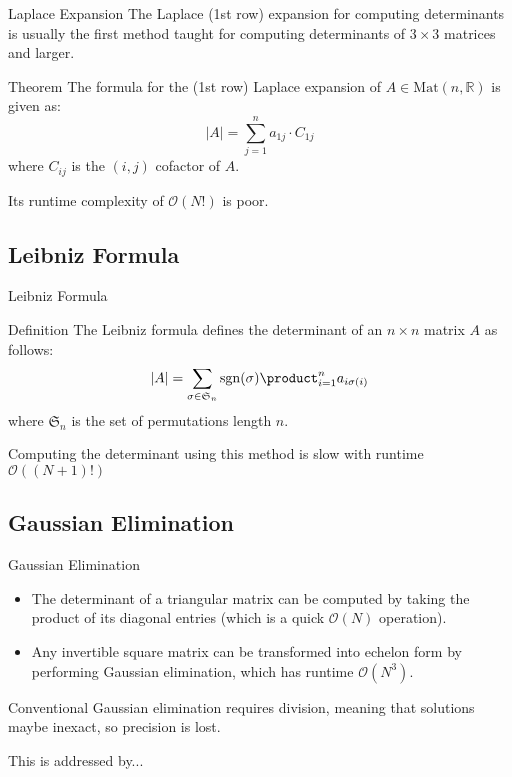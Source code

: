 \documentclass{beamer}
\begin{document}
\begin{frame}{Laplace Expansion}
    The Laplace (1st row) expansion for computing determinants is usually the first method taught for
    computing determinants of $3 \times 3$ matrices and larger.

    \begin{block}{Theorem}
        The formula for the (1st row) Laplace expansion of $A \in \mathrm{Mat}(n, \mathbb{R})$ is given as:
        \[
            |A| = \sum_{j=1}^n a_{1j}\cdot C_{1j}
        \]
        where $C_{ij}$ is the $(i, j)$ cofactor of $A$.
    \end{block}

    Its runtime complexity of $\mathcal{O}(N!)$ is poor.

\end{frame}

\subsection{Leibniz Formula}

\begin{frame}{Leibniz Formula}
    \begin{block}{Definition}
        The Leibniz formula defines the determinant of an $n \times n$ matrix $A$ as follows:
        \[
            |A| = \sum_{\sigma \in \mathfrak{S}_n} \mathrm{sgn}(\sigma) \product_{i=1}^n a_{i \sigma(i)}
        \]
        where $\mathfrak{S}_n$ is the set of permutations length $n$.
    \end{block}

    Computing the determinant using this method is slow with runtime $\mathcal{O}((N+1)!)$
\end{frame}

\subsection{Gaussian Elimination}

\begin{frame}{Gaussian Elimination}

    \begin{itemize}

        \item The determinant of a triangular matrix can be computed by taking the product of its
            diagonal entries (which is a quick $\mathcal{O}(N)$ operation).

        \item Any invertible square matrix can be transformed into echelon form by performing
            Gaussian elimination, which has runtime $\mathcal{O}(N^3)$.

    \end{itemize}
    Conventional Gaussian elimination requires division, meaning that solutions maybe inexact,
    so precision is lost.

    This is addressed by...

\end{frame}
\end{document}
